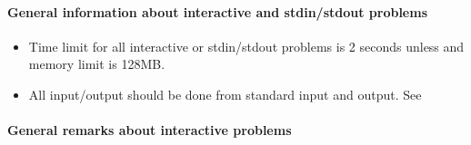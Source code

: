 \hypertarget{info-sheet}{}
\paragraph{General information about interactive and stdin/stdout problems}
\begin{itemize}
    \item Time limit for all interactive or stdin/stdout problems is 2 seconds unless and memory limit is 128MB.
    \item All input/output should be done from standard input and output.
    See 
\end{itemize}

\paragraph{General remarks about interactive problems}
\hypertarget{info-interactive}{}
